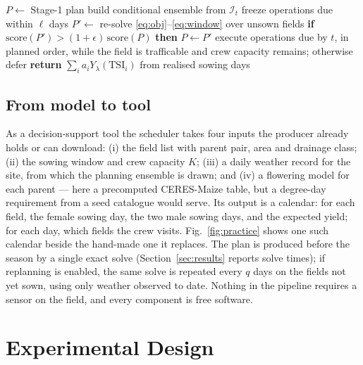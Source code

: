 \documentclass[10pt,twocolumn]{article}
\newcommand{\TSI}{\mathrm{TSI}}
\begin{document}
\begin{algorithm}[t]
\caption{Rolling-horizon execution (S4; S1--S3, S5 skip lines 3--8)}
\label{alg:roll}
\small
\begin{algorithmic}[1]
\STATE $P \leftarrow$ Stage-1 plan
    \STATE build conditional ensemble from $\mathcal{I}_t$ 
    \STATE freeze operations due within $\ell$ days
    \STATE $P' \leftarrow$ re-solve \eqref{eq:obj}--\eqref{eq:window} over unsown fields
    \STATE \textbf{if} $\mathrm{score}(P') > (1+\epsilon)\,\mathrm{score}(P)$ \textbf{then} $P \leftarrow P'$
  \ENDIF
  \STATE execute operations due by $t$, in planned order, while the field is
         trafficable and crew capacity remains; otherwise defer
\ENDFOR
\STATE \textbf{return} $\sum_i a_i Y_\lambda(\TSI_i)$ from realised sowing days
\end{algorithmic}
\end{algorithm}

\subsection{From model to tool}
\label{sec:tool}

As a decision-support tool the scheduler takes four inputs the producer
already holds or can download: (i) the field list with parent pair, area
and drainage class; (ii) the sowing window and crew capacity $K$; (iii) a
daily weather record for the site, from which the planning ensemble is
drawn; and (iv) a flowering model for each parent --- here a precomputed
CERES-Maize table, but a degree-day requirement from a seed catalogue
would serve. Its output is a calendar: for each field, the female sowing
day, the two male sowing days, and the expected yield; for each day, which
fields the crew visits. Fig.~\ref{fig:practice} shows one such calendar
beside the hand-made one it replaces. The plan is produced before the
season by a single exact solve (Section~\ref{sec:results} reports solve
times); if replanning is enabled, the same solve is repeated every $q$ days
on the fields not yet sown, using only weather observed to date. Nothing
in the pipeline requires a sensor on the field, and every component is
free software.

\section{Experimental Design}
\label{sec:design}
\end{document}

